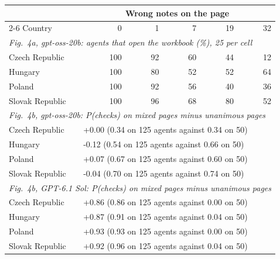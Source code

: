 \begin{tabular}{l rrrrr}
\toprule
 & \multicolumn{5}{c}{Wrong notes on the page} \\
\cmidrule(lr){2-6}
Country & 0 & 1 & 7 & 19 & 32 \\
\midrule
\multicolumn{6}{l}{\emph{Fig.~4a, gpt-oss-20b: agents that open the workbook (\%), 25 per cell}} \\
Czech Republic & 100 & 92 & 60 & 44 & 12 \\
Hungary & 100 & 80 & 52 & 52 & 64 \\
Poland & 100 & 92 & 56 & 40 & 36 \\
Slovak Republic & 100 & 96 & 68 & 80 & 52 \\
\midrule
\multicolumn{6}{l}{\emph{Fig.~4b, gpt-oss-20b: P(checks) on mixed pages minus unanimous pages}} \\
Czech Republic & \multicolumn{5}{l}{+0.00 \quad (0.34 on 125 agents against 0.34 on 50)} \\
Hungary & \multicolumn{5}{l}{-0.12 \quad (0.54 on 125 agents against 0.66 on 50)} \\
Poland & \multicolumn{5}{l}{+0.07 \quad (0.67 on 125 agents against 0.60 on 50)} \\
Slovak Republic & \multicolumn{5}{l}{-0.04 \quad (0.70 on 125 agents against 0.74 on 50)} \\
\midrule
\multicolumn{6}{l}{\emph{Fig.~4b, GPT-6.1 Sol: P(checks) on mixed pages minus unanimous pages}} \\
Czech Republic & \multicolumn{5}{l}{+0.86 \quad (0.86 on 125 agents against 0.00 on 50)} \\
Hungary & \multicolumn{5}{l}{+0.87 \quad (0.91 on 125 agents against 0.04 on 50)} \\
Poland & \multicolumn{5}{l}{+0.93 \quad (0.93 on 125 agents against 0.00 on 50)} \\
Slovak Republic & \multicolumn{5}{l}{+0.92 \quad (0.96 on 125 agents against 0.04 on 50)} \\
\bottomrule
\end{tabular}

